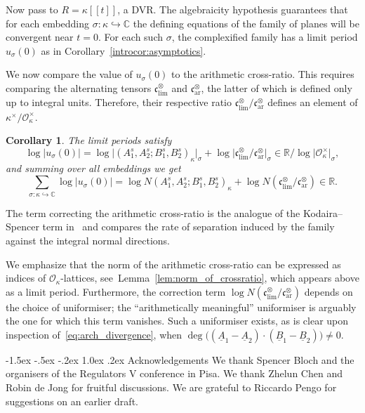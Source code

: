 \documentclass[11pt,a4paper]{amsart}
\makeatletter
\renewcommand\subsection{\@startsection{subsection}{2}{\z@}
                                   {-1.5ex \@plus -.5ex \@minus -.2ex}%
                                   {1.0ex \@plus.2ex}%
                                   {\normalfont\itshape}}%
\newcommand{\C}{\mathbb{C}}
\newcommand{\R}{\mathbb{R}}
\newcommand{\xc}{\mathfrak{c}}
\theoremstyle{plain}
\newtheorem{corCsecond}{Corollary}         %
\theoremstyle{definition}
\theoremstyle{remark}
\newcommand{\abs}[1]{\lvert #1 \rvert}
\newcommand{\co}{\mathcal{O}}
\newcommand{\toi}{\hookrightarrow}
\newcommand{\xci}[1][]{\xc_{\mathrm{lim}#1}} %
\newcommand{\xca}[1][]{\xc_{\mathrm{ar}#1}} %
\makeatother
\begin{document}
Now pass to $R = \kappa[[t]]$, a DVR. The algebraicity hypothesis guarantees that for each embedding $\sigma\colon \kappa \toi \C$ the defining equations of the family of planes will be convergent near $t=0$. For each such $\sigma$, the complexified family has a limit period $u_\sigma(0)$ as in Corollary~\ref{introcor:asymptotics}.

We now compare the value of $u_\sigma(0)$ to the arithmetic cross-ratio. This requires comparing the alternating tensors $\xci^\otimes$ and $\xca^\otimes$, the latter of which is defined only up to integral units. Therefore, their respective ratio $\xci^\otimes/\xca^\otimes$ defines an element of $\kappa^\times/\co_\kappa^\times$. 

\begin{corCsecond}\label{introcor:norm}
  The limit periods satisfy
  \[
    \log\abs{u_\sigma(0)}
      = \log\abs{(A_1^s,A_2^s;B_1^s,B_2^s)_\kappa}_\sigma + \log\abs{\xci^\otimes/\xca^\otimes}_\sigma \in \R/\log\abs{\co_\kappa^\times}_\sigma,
  \]
  and summing over all embeddings we get
  \[
    \sum_{\sigma\colon\kappa\hookrightarrow\C} \log\abs{u_\sigma(0)}
      = \log N (A_1^s,A_2^s;B_1^s,B_2^s)_\kappa + \log N(\xci^\otimes/\xca^\otimes) \in \R.
  \]
\end{corCsecond}

The term correcting the arithmetic cross-ratio is the analogue of the Kodaira--Spencer term in~\cite[Main~Theorem]{BlochDeJongSertoz2023} and compares the rate of separation induced by the family against the integral normal directions. 

We emphasize that the norm of the arithmetic cross-ratio can be expressed as indices of $\co_\kappa$-lattices, see~Lemma~\ref{lem:norm_of_crossratio}, which appears above as a limit period. Furthermore, the correction term $\log N(\xci^\otimes/\xca^\otimes)$ depends on the choice of uniformiser; the ``arithmetically meaningful'' uniformiser is arguably the one for which this term vanishes. Such a uniformiser exists, as is clear upon inspection of~\eqref{eq:arch_divergence}, when $\deg\big((\underline A_1-\underline A_2)\cdot(\underline B_1-\underline B_2)\big) \neq 0$.


\subsection{Acknowledgements} 
We thank Spencer Bloch and the organisers of the Regulators V conference in Pisa. We thank Zhelun Chen and Robin de Jong for fruitful discussions. We are grateful to Riccardo Pengo for suggestions on an earlier draft.
\end{document}
